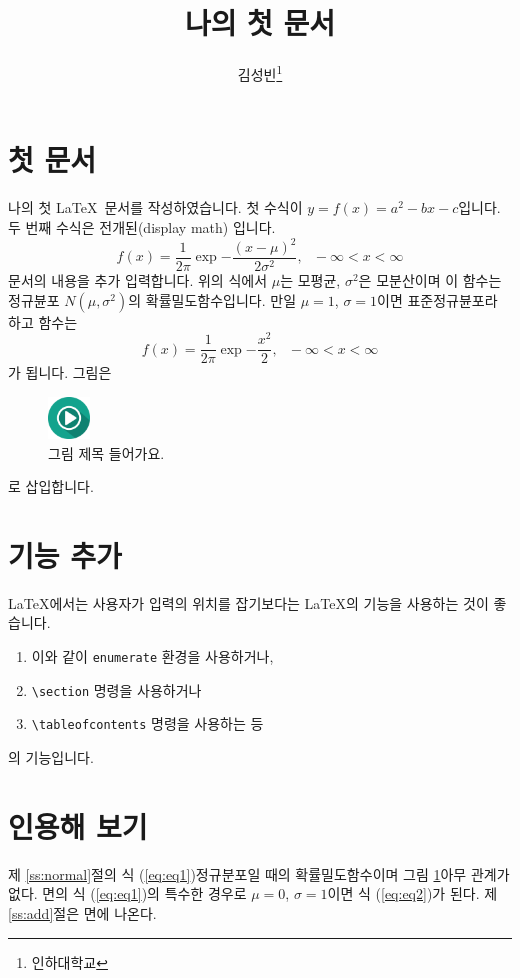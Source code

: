 \documentclass[11pt]{article}
\title{나의 첫 문서}
\author{김성빈\thanks{인하대학교}}
\begin{document}
\maketitle
\tableofcontents
\section{첫 문서\label{ss:normal}}
나의 첫 \LaTeX\ 문서를 작성하였습니다. 첫 
수식이 $y=f(x)=a^2 - bx - c$입니다.
두 번째 수식은 전개된(display math) 입니다.
\begin{equation} \label{eq:eq1}
f(x) = \frac{1}{2\pi} \exp{-\frac{(x-\mu)^2}{2\sigma^2}}, 
\ \ \ -\infty < x < \infty
\end{equation}
문서의 내용을 추가 입력합니다.
위의 식에서 $\mu$는 모평균, $\sigma^2$은 모분산이며 이 함수는 
정규뷴포 $N(\mu, \sigma^2)$의 확률밀도함수입니다. 만일 $\mu=1$, 
$\sigma=1$이면 표준정규뷴포라 하고 함수는
\begin{equation} \label{eq:eq2}
f(x) = \frac{1}{2\pi} \exp{-\frac{x^2}{2}}, 
\ \ \ -\infty < x < \infty
\end{equation}
가 됩니다. 그림은
\begin{figure}
\begin{center}
\includegraphics[width=3em]{../images/play.png}
\end{center}
\caption{그림 제목 들어가요.} \label{fig:play2}
\end{figure}
로 삽입합니다.
\section{기능 추가 \label{ss:add}}
\LaTeX 에서는 사용자가 입력의 위치를 잡기보다는 \LaTeX 의 
기능을 사용하는 것이 좋습니다.
\begin{enumerate}
\item 이와 같이 \texttt{enumerate} 환경을 사용하거나,
\item \verb|\section| 명령을 사용하거나
\item \verb|\tableofcontents| 명령을 사용하는 등
\end{enumerate}
의 기능입니다.
\section{인용해 보기}
제 \ref{ss:normal}절의 식 (\ref{eq:eq1})\은 정규분포일 때의
확률밀도함수이며 그림 \ref{fig:play2} 아무 관계가 없다.
\pageref{eq:eq1}면의 식 (\ref{eq:eq1})의 특수한 경우로 $\mu=0$,
$\sigma=1$이면 식 (\ref{eq:eq2})가 된다. 제\ref{ss:add}절은
\pageref{ss:add}면에 나온다.
\end{document}
